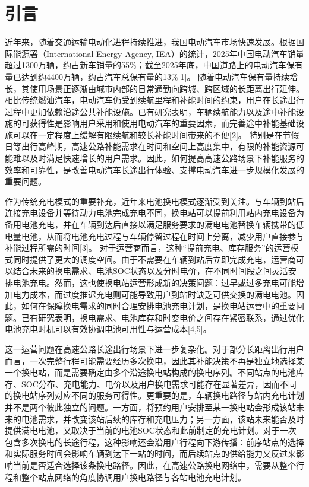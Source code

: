 \section{引言}


近年来，随着交通运输电动化进程持续推进，我国电动汽车市场快速发展。根据国际能源署（International Energy Agency, IEA）的统计，2025年中国电动汽车销量超过1300万辆，约占新车销量的55\%；截至2025年底，中国道路上的电动汽车保有量已达到约4400万辆，约占汽车总保有量的13\%[1]。 随着电动汽车保有量持续增长，其使用场景正逐渐由城市内部的日常通勤向跨城、跨区域的长距离出行延伸。相比传统燃油汽车，电动汽车仍受到续航里程和补能时间的约束，用户在长途出行过程中更加依赖沿途公共补能设施。已有研究表明，车辆续航能力以及途中补能设施的可获得性是影响用户采用和使用电动汽车的重要因素，而完善途中补能基础设施可以在一定程度上缓解有限续航和较长补能时间带来的不便[2]。 特别是在节假日等出行高峰期，高速公路补能需求在时间和空间上高度集中，有限的补能资源可能难以及时满足快速增长的用户需求。因此，如何提高高速公路场景下补能服务的效率和可靠性，是改善电动汽车长途出行体验、支撑电动汽车进一步规模化发展的重要问题。

作为传统充电模式的重要补充，近年来电池换电模式逐渐受到关注。与车辆到站后连接充电设备并等待动力电池完成充电不同，换电站可以提前利用站内充电设备为备用电池充电，并在车辆到达后直接以满足服务要求的满电电池替换车辆携带的低电量电池，从而将电池充电过程与车辆停留过程在时间上分离，减少用户直接参与补能过程所需的时间[3]。 对于运营商而言，这种“提前充电、库存服务”的运营模式同时提供了更大的调度空间。由于不需要在车辆到站后立即完成充电，运营商可以结合未来的换电需求、电池SOC状态以及分时电价，在不同时间段之间灵活安排电池充电。然而，这也使换电站运营形成新的决策问题：过早或过多充电可能增加电力成本，而过度推迟充电则可能导致用户到站时缺乏可供交换的满电电池。因此，如何在保障换电需求的同时合理安排电池充电计划，是换电站运营中的重要问题。已有研究表明，换电需求、电池库存和时变电价之间存在紧密联系，通过优化电池充电时机可以有效协调电池可用性与运营成本[4,5]。

这一运营问题在高速公路长途出行场景下进一步复杂化。对于部分长距离出行用户而言，一次完整行程可能需要经历多次换电，因此其补能决策不再是独立地选择某一个换电站，而是需要确定由多个沿途换电站构成的换电序列。不同站点的电池库存、SOC分布、充电能力、电价以及用户换电需求可能存在显著差异，因而不同的换电站序列对应不同的服务可得性。更重要的是，车辆换电路径与站内充电计划并不是两个彼此独立的问题。一方面，将预约用户安排至某一换电站会形成该站未来的电池需求，并改变该站后续的库存和充电压力；另一方面，该站未来能否及时提供满电电池，又取决于当前的电池SOC状态和此前制定的充电计划。对于一次包含多次换电的长途行程，这种影响还会沿用户行程向下游传播：前序站点的选择和实际服务时间会影响车辆到达下一站的时间，而后续站点的供给能力又反过来影响当前是否适合选择该条换电路径。因此，在高速公路换电网络中，需要从整个行程和整个站点网络的角度协调用户换电路径与各站电池充电计划。

